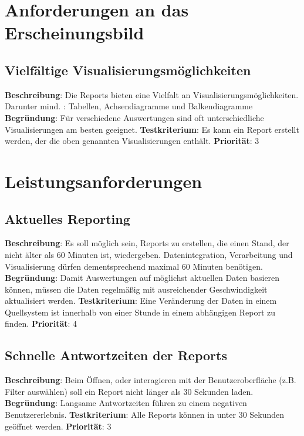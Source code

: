 \section{Anforderungen an das Erscheinungsbild} 

\subsection{Vielfältige Visualisierungsmöglichkeiten} \label{sec:anforderungsspezifikation:vielfältigeVisualisierungsmöglichkeiten}
\textbf{Beschreibung}: Die Reports bieten eine Vielfalt an Visualisierungsmöglichkeiten. Darunter mind. : Tabellen, Achsendiagramme und Balkendiagramme
\newline \textbf{Begründung}: Für verschiedene Auswertungen sind oft unterschiedliche Visualisierungen am besten geeignet.
\newline \textbf{Testkriterium}: Es kann ein Report erstellt werden, der die oben genannten Visualisierungen enthält.
\newline \textbf{Priorität}: 3

\section{Leistungsanforderungen} 

\subsection{Aktuelles Reporting} \label{sec:anforderungsspezifikation:SchnelleDatenintegration}
\textbf{Beschreibung}: Es soll möglich sein, Reports zu erstellen, die einen Stand, der nicht älter als 60 Minuten ist, wiedergeben. Datenintegration, Verarbeitung und Visualisierung dürfen dementsprechend maximal 60 Minuten benötigen.
\newline \textbf{Begründung}: Damit Auswertungen auf möglichst aktuellen Daten basieren können, müssen die Daten regelmäßig mit ausreichender Geschwindigkeit aktualisiert werden. 
\newline \textbf{Testkriterium}: Eine Veränderung der Daten in einem Quellsystem ist innerhalb von einer Stunde in einem abhängigen Report zu finden.
\newline \textbf{Priorität}: 4

\subsection{Schnelle Antwortzeiten der Reports} \label{sec:anforderungsspezifikation:schnelleAntwortzeitenDerReports}
\textbf{Beschreibung}: Beim Öffnen, oder interagieren mit der Benutzeroberfläche (z.B. Filter auswählen) soll ein Report nicht länger als 30 Sekunden laden.
\newline \textbf{Begründung}: Langsame Antwortzeiten führen zu einem negativen Benutzererlebnis.
\newline \textbf{Testkriterium}: Alle Reports können in unter 30 Sekunden geöffnet werden.
\newline \textbf{Priorität}: 3

